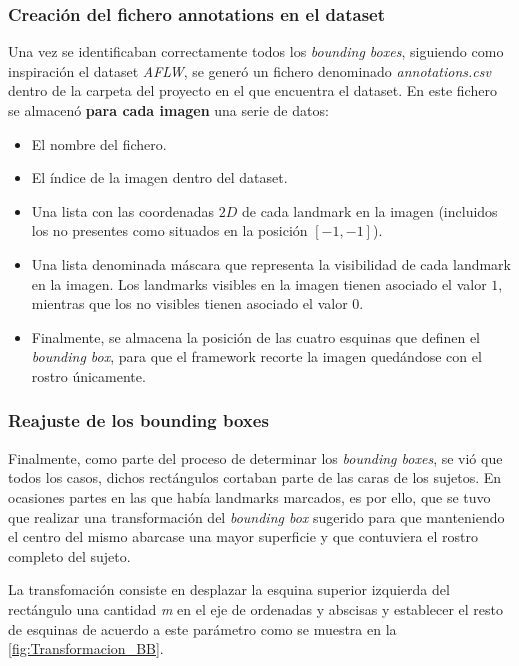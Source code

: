         \subsubsection{Creación del fichero annotations en el dataset}

            \noindent Una vez se identificaban correctamente todos los \textit{bounding boxes}, siguiendo como inspiración el dataset \textit{AFLW}, se generó un fichero denominado \textit{annotations.csv} dentro de la carpeta del proyecto en el que encuentra el dataset. En este fichero se almacenó \textbf{para cada imagen} una serie de datos: 

            \begin{itemize}
                \item El nombre del fichero.
                \item El índice de la imagen dentro del dataset. 
                \item Una lista con las coordenadas $2D$ de cada landmark en la imagen (incluidos los no presentes como situados en la posición $[-1,-1]$). 
                \item Una lista denominada máscara que representa la visibilidad de cada landmark en la imagen. Los landmarks visibles en la imagen tienen asociado el valor $1$, mientras que los no visibles tienen asociado el valor $0$.
                \item Finalmente, se almacena la posición de las cuatro esquinas que definen el \textit{bounding box}, para que el framework recorte la imagen quedándose con el rostro únicamente. 
            \end{itemize}

        \subsubsection{Reajuste de los bounding boxes}
            \noindent Finalmente, como parte del proceso de determinar los \textit{bounding boxes}, se vió que todos los casos, dichos rectángulos cortaban parte de las caras de los sujetos. En ocasiones partes en las que había landmarks marcados, es por ello, que se tuvo que realizar una transformación del \textit{bounding box} sugerido para que manteniendo el centro del mismo abarcase una mayor superficie y que contuviera el rostro completo del sujeto. 

            \medskip

            \noindent La transfomación consiste en desplazar la esquina superior izquierda del rectángulo una cantidad \textit{m} en el eje de ordenadas y abscisas y establecer el resto de esquinas de acuerdo a este parámetro como se muestra en la \autoref{fig:Transformacion_BB}.


